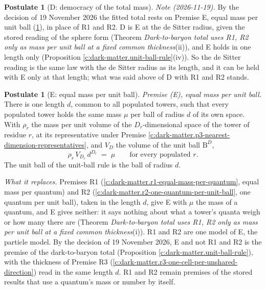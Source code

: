 \documentclass[11pt]{article}
\theoremstyle{definition}
\newtheorem{postulate}[theorem]{Postulate}
\theoremstyle{plain}
\providecommand{\B}{}\renewcommand{\B}{\mathrm{B}}
\begin{document}
\begin{postulate}[D: democracy of the total mass]
\emph{Note (2026-11-19).} By the decision of 19 November 2026 the fitted total rests on Premise E, equal mass per unit ball (\ref{c:dark-matter.e-equal-mass-per-unit-ball}), in place of R1 and R2. D is E at the de Sitter radius, given the stored reading of the sphere form (Theorem \emph{Dark-to-baryon total uses R1, R2 only as mass per unit ball at a fixed common thickness}(ii)), and E holds in one length only (Proposition \ref{c:dark-matter.unit-ball-rule}(iv)). So the de Sitter reading is the same law with the de Sitter radius as its length, and it can be held with E only at that length; what was said above of D with R1 and R2 stands.
\end{postulate}

\begin{postulate}[E: equal mass per unit ball]\label{c:dark-matter.e-equal-mass-per-unit-ball}
\emph{Premise (E), equal mass per unit ball.} There is one length $d$, common to all populated towers, such that every populated tower holds the same mass $\mu$ per ball of radius $d$ of its own space. With $\rho_{r}$ the mass per unit volume of the $D_{r}$-dimensional space of the tower of residue $r$, at its representative under Premise \ref{c:dark-matter.p3-nearest-dimension-representatives}, and $V_{D}$ the volume of the unit ball $\B^{D}$,
\[
\rho_{r}\,V_{D_{r}}\,d^{D_{r}} \;=\; \mu \qquad \text{for every populated } r .
\]
The unit ball of the unit-ball rule is the ball of radius $d$.

\emph{What it replaces.} Premises R1 (\ref{c:dark-matter.r1-equal-mass-per-quantum}, equal mass per quantum) and R2 (\ref{c:dark-matter.r2-one-quantum-per-unit-ball}, one quantum per unit ball), taken in the length $d$, give E with $\mu$ the mass of a quantum, and E gives neither: it says nothing about what a tower's quanta weigh or how many there are (Theorem \emph{Dark-to-baryon total uses R1, R2 only as mass per unit ball at a fixed common thickness}(i)). R1 and R2 are one model of E, the particle model. By the decision of 19 November 2026, E and not R1 and R2 is the premise of the dark-to-baryon total (Proposition \ref{c:dark-matter.unit-ball-rule}), with the thickness of Premise R3 (\ref{c:dark-matter.r3-one-cell-per-unshared-direction}) read in the same length $d$. R1 and R2 remain premises of the stored results that use a quantum's mass or number by itself.


\end{postulate}
\end{document}
